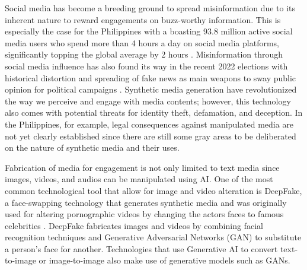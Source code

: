 \documentclass[journal]{./IEEE/IEEEtran}
\begin{document}
\par Social media has become a breeding ground to spread misinformation due to its inherent nature to reward engagements on buzz-worthy information\cite{usc}. This is especially the case for the Philippines with a boasting 93.8 million active social media users who spend more than 4 hours a day on social media platforms, significantly topping the global average by 2 hours \cite{socmed-ph}. Misinformation through social media influence has also found its way in the recent 2022 elections with historical distortion and spreading of fake news as main weapons to sway public opinion for political campaigns \cite{campaign}. Synthetic media generation have revolutionized the way we perceive and engage with media contents; however, this technology also comes with potential threats for identity theft, defamation, and deception. In the Philippines, for example, legal consequences against manipulated media are not yet clearly established \cite{news-ph} since there are still some gray areas to be deliberated on the nature of synthetic media and their uses.

\par Fabrication of media for engagement is not only limited to text media since images, videos, and audios can be manipulated using AI. One of the most common technological tool that allow for image and video alteration is DeepFake, a face-swapping technology that generates synthetic media and was originally used for altering pornographic videos by changing the actors faces to famous celebrities \cite{history-deepfake}. DeepFake fabricates images and videos by combining facial recognition techniques and Generative Adversarial Networks (GAN)\cite{GAN} to substitute a person's face for another. Technologies that use Generative AI to convert text-to-image or image-to-image also make use of generative models such as GANs. 
\end{document}
